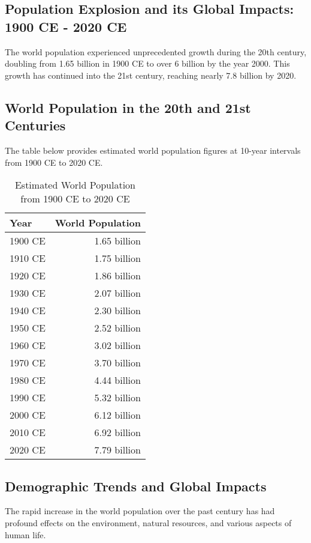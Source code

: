 \documentclass[a4paper,12pt]{book}
\begin{document}
\subsection*{Population Explosion and its Global Impacts: 1900 CE - 2020 CE}
The world population experienced unprecedented growth during the 20th century, doubling from 1.65 billion in 1900 CE to over 6 billion by the year 2000. This growth has continued into the 21st century, reaching nearly 7.8 billion by 2020.

\subsection*{World Population in the 20th and 21st Centuries}
The table below provides estimated world population figures at 10-year intervals from 1900 CE to 2020 CE.

\begin{table}[h!]
\centering
\begin{tabular}{|l|r|}
\hline
Year & World Population \\
\hline
1900 CE & 1.65 billion \\
1910 CE & 1.75 billion \\
1920 CE & 1.86 billion \\
1930 CE & 2.07 billion \\
1940 CE & 2.30 billion \\
1950 CE & 2.52 billion \\
1960 CE & 3.02 billion \\
1970 CE & 3.70 billion \\
1980 CE & 4.44 billion \\
1990 CE & 5.32 billion \\
2000 CE & 6.12 billion \\
2010 CE & 6.92 billion \\
2020 CE & 7.79 billion \\
\hline
\end{tabular}
\caption{Estimated World Population from 1900 CE to 2020 CE}
\label{tab:world_population_1900_2020}
\end{table}

\subsection*{Demographic Trends and Global Impacts}
The rapid increase in the world population over the past century has had profound effects on the environment, natural resources, and various aspects of human life.
\end{document}
